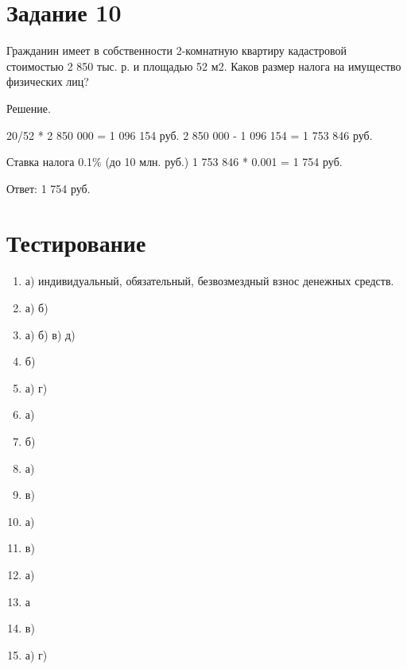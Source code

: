\documentclass[14pt,a4paper]{extarticle}
\begin{document}
\section{Задание 10}
Гражданин имеет в собственности 2-комнатную квартиру кадастровой
стоимостью 2 850 тыс. р. и площадью 52 м2.
Каков размер налога на имущество физических лиц?

Решение.

20/52 * 2 850 000 = 1 096 154 руб.
2 850 000 - 1 096 154 = 1 753 846 руб.

Ставка налога 0.1\% (до 10 млн. руб.)
1 753 846 * 0.001 = 1 754 руб.

Ответ: 1 754 руб.

\section{Тестирование}
\begin{enumerate}
    \item а) индивидуальный, обязательный, безвозмездный взнос денежных средств.
    \item а) б)
    \item а) б) в) д)
    \item б)
    \item а) г)
    \item а)
    \item б)
    \item а)
    \item в)
    \item а)
    \item в)
    \item а)
    \item а
    \item в)
    \item а) г)
\end{enumerate}
\end{document}
